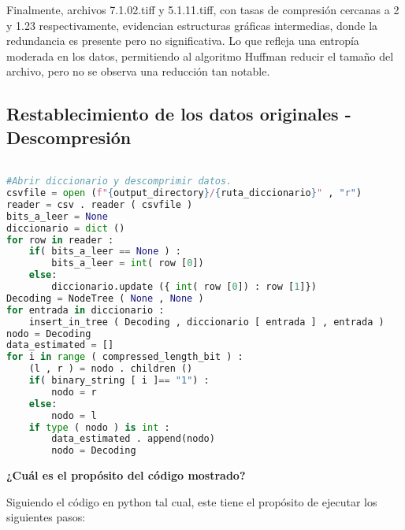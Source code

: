 \documentclass[conference,onecolumn,12pt]{IEEEtran}
\numberwithin{equation}{subsection}
\begin{document}
Finalmente, archivos 7.1.02.tiff y 5.1.11.tiff, con tasas de compresión cercanas a 2 y 1.23 respectivamente, evidencian estructuras gráficas intermedias, donde la redundancia es presente pero no significativa. Lo que refleja una entropía moderada en los datos, permitiendo al algoritmo Huffman reducir el tamaño del archivo, pero no se observa una reducción tan notable.






\newpage


\subsection{Restablecimiento de los datos originales - Descompresión}

\begin{lstlisting}[language=Python, caption={Código modificado para guardar los datos en una carpeta de destino}, label={listing3}]

#Abrir diccionario y descomprimir datos.
csvfile = open (f"{output_directory}/{ruta_diccionario}" , "r")
reader = csv . reader ( csvfile )
bits_a_leer = None 
diccionario = dict () 
for row in reader :
    if( bits_a_leer == None ) :
        bits_a_leer = int( row [0]) 
    else:
        diccionario.update ({ int( row [0]) : row [1]})
Decoding = NodeTree ( None , None ) 
for entrada in diccionario :
    insert_in_tree ( Decoding , diccionario [ entrada ] , entrada )
nodo = Decoding 
data_estimated = []
for i in range ( compressed_length_bit ) :
    (l , r ) = nodo . children () 
    if( binary_string [ i ]== "1") :
        nodo = r
    else:
        nodo = l
    if type ( nodo ) is int :
        data_estimated . append(nodo)
        nodo = Decoding


\end{lstlisting}

\textbf{¿Cuál es el propósito del código mostrado?}

Siguiendo el código en python tal cual, este tiene el propósito de ejecutar los siguientes pasos:
\end{document}
